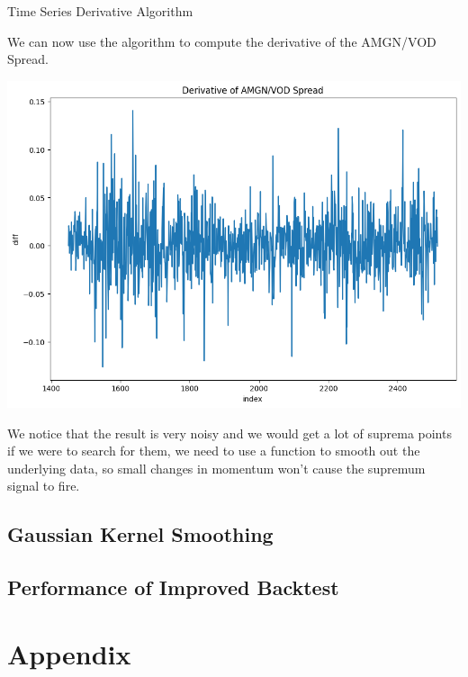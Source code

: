 \documentclass{article}
\begin{document}
\begin{spacing}{2.0}
\begin{algorithm}
    \caption{Time Series Derivative Algorithm}
    \begin{algorithmic}
        \EndFor
    \end{algorithmic}
\end{algorithm}
We can now use the algorithm to compute the derivative of the AMGN/VOD Spread.
\begin{center}
    \includegraphics[scale=0.40]{./images/amgn_vod_derivative.png}
\end{center}
We notice that the result is very noisy and we would get a lot of suprema points if we were to search for them, we need to use a function to smooth out the underlying data, so
small changes in momentum won't cause the supremum signal to fire.

\newpage

\subsection{Gaussian Kernel Smoothing}

\subsection{Performance of Improved Backtest}

\newpage

\section{Appendix}


\end{spacing}
\end{document}

